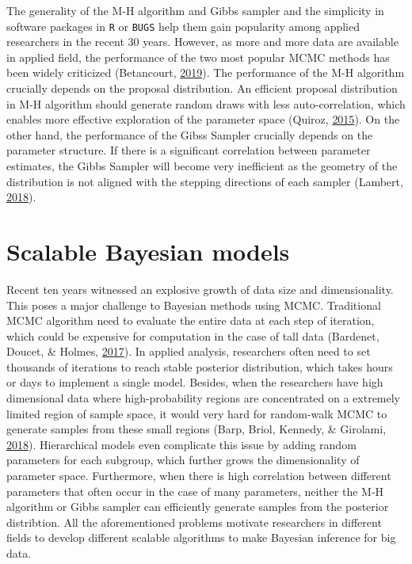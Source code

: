 \documentclass[12pt]{book}
\numberwithin{equation}{chapter}
\begin{document}
The generality of the M-H algorithm and Gibbs sampler and the simplicity in software packages in \texttt{R} or \texttt{BUGS} help them gain popularity among applied researchers in the recent 30 years. However, as more and more data are available in applied field, the performance of the two most popular MCMC methods has been widely criticized (Betancourt, \protect\hyperlink{ref-betancourt2019convergence}{2019}). The performance of the M-H algorithm crucially depends on the proposal distribution. An efficient proposal distribution in M-H algorithm should generate random draws with less auto-correlation, which enables more effective exploration of the parameter space (Quiroz, \protect\hyperlink{ref-quiroz2015bayesian}{2015}). On the other hand, the performance of the Gibss Sampler crucially depends on the parameter structure. If there is a significant correlation between parameter estimates, the Gibbs Sampler will become very inefficient as the geometry of the distribution is not aligned with the stepping directions of each sampler (Lambert, \protect\hyperlink{ref-lambert2018student}{2018}).

\hypertarget{scalable-bayesian-models}{%
\section{Scalable Bayesian models}\label{scalable-bayesian-models}}

Recent ten years witnessed an explosive growth of data size and dimensionality. This poses a major challenge to Bayesian methods using MCMC. Traditional MCMC algorithm need to evaluate the entire data at each step of iteration, which could be expensive for computation in the case of tall data (Bardenet, Doucet, \& Holmes, \protect\hyperlink{ref-bardenet2017markov}{2017}). In applied analysis, researchers often need to set thousands of iterations to reach stable posterior distribution, which takes hours or days to implement a single model. Besides, when the researchers have high dimensional data where high-probability regions are concentrated on a extremely limited region of sample space, it would very hard for random-walk MCMC to generate samples from these small regions (Barp, Briol, Kennedy, \& Girolami, \protect\hyperlink{ref-barp2018geometry}{2018}). Hierarchical models even complicate this issue by adding random parameters for each subgroup, which further grows the dimensionality of parameter space. Furthermore, when there is high correlation between different parameters that often occur in the case of many parameters, neither the M-H algorithm or Gibbs sampler can efficiently generate samples from the posterior distribtion. All the aforementioned problems motivate researchers in different fields to develop different scalable algorithms to make Bayesian inference for big data.
\end{document}
